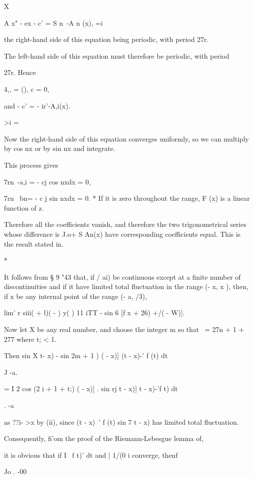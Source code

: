 {X

 A x" - ex - c' = S n~-A n (x), =i

the right-hand side of this equation being periodic, with period 27r.

The left-hand side of this equation must therefore be periodic, with
period

27r. Hence

 4,, = (), c = 0,

and - c' = - ir'-A,i(x).

>i = \

Now the right-hand side of this equation converges uniformly, so we
can multiply by cos nx or by sin nx and integrate.

This process gives

7rn~-a,i = - cj cos nxdx = 0,

7rn~ bn= - c j sin nxdx = 0. * If it is zero throughout the range, F
(x) is a linear function of z.

%
%
Therefore all the coefficients vanish, and therefore the two
trigonometrical series whose difference is J.o+ S An(x) have
corresponding coefficients equal. This is the result stated in.

*

It follows from § 9 "43 that, if / ai) be continuous except at a
finite number of discontinuities and if it have limited total
fluctuation in the range (- x, x ), then, if x be any internal point
of the range (- a, /3),

lim' r siii( + l)( - ) y( ) 11 iTT - sin 6 [f x + 26) +/( - W)].

Now let X be any real number, and choose the integer m so that \ = 27n
+ 1 + 277 where t; < 1.

Then sin X t- x) - sin 2m + 1 ) ( - x)] (t - x)-' f (t) dt

J -a.

= I 2 cos (2 i + 1 + t;) ( - x)] . sin rj t - x)] t - x)-'f t) dt

. -a

as ??i- >x by (ii), since (t - x)~' f (t) sin 7 t - x) has
limited total fluctuation.

Consequently, fi'om the proof of the Riemann-Lebesgue lemma of,

it is obvious that if I \ f t)' dt and | 1/(0 i converge, thenf

Jo . -00

}
